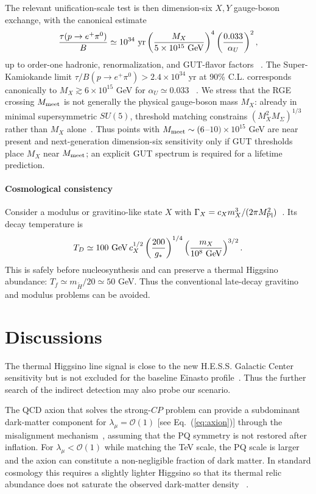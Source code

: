 \documentclass[superscriptaddress,aps,preprintnumbers,amsmath,amssymb,prd,nofootinbib,reprint]{revtex4-1}
\newcommand{\Eq}[1]{Eq.~(\ref{eq:#1})}
\def\O{\mathcal{O}}
\def\l{\lambda}
\newcommand{\mpl}{M_{\rm Pl}}
\def\WY#1{#1}
\begin{document}
The relevant unification-scale test is then dimension-six $X,Y$ gauge-boson
exchange, with the canonical estimate
\begin{equation}
 \frac{\tau(p\to e^+\pi^0)}{B}
 \simeq 10^{34}\ {\rm yr}
 \left(\frac{M_X}{5\times 10^{15}\ {\rm GeV}}\right)^4
 \left(\frac{0.033}{\alpha_U}\right)^2 ,
 \label{eq:proton-d6}
\end{equation}
up to order-one hadronic, renormalization, and GUT-flavor factors
~\cite{Hisano:2022proton,Ellis:2020proton}.  The Super-Kamiokande limit
$\tau/B(p\to e^+\pi^0)>2.4\times10^{34}$ yr at 90\% C.L. corresponds
canonically to $M_X\gtrsim6\times10^{15}$ GeV for $\alpha_U\simeq0.033$
~\cite{Super-Kamiokande:2020wjk}.  We stress that the RGE crossing
$M_{\rm meet}$ is not generally the physical gauge-boson mass $M_X$:
already in minimal supersymmetric $SU(5)$, threshold matching constrains
$(M_X^2M_\Sigma)^{1/3}$ rather than $M_X$ alone~\cite{Hisano:2013gut}.
Thus points with $M_{\rm meet}\sim(6$--$10)\times10^{15}$ GeV are near
present and next-generation dimension-six sensitivity only if GUT
thresholds place $M_X$ near $M_{\rm meet}$; an explicit GUT spectrum is
required for a lifetime prediction.
\endgroup

\paragraph{Cosmological consistency}
Consider a modulus or gravitino-like state $X$ with
$\Gamma_X=c_Xm_X^3/(2\pi\mpl^2)$~\cite{Nakamura:2006uc,Asaka:2006bv}.  Its decay temperature is
\begin{equation}
 T_D\simeq100\ {\rm GeV}\,c_X^{1/2}
 \left(\frac{200}{g_*}\right)^{1/4}
 \left(\frac{m_X}{10^8\ {\rm GeV}}\right)^{3/2}.
\end{equation}
This is safely before nucleosynthesis and can  preserve a
thermal Higgsino abundance: $T_f\simeq m_{\widetilde H}/20\simeq50$ GeV.
Thus the conventional late-decay gravitino and modulus problems can be
avoided.


\section{Discussions}
The thermal Higgsino line signal is close to the new H.E.S.S. \WY{Galactic Center}
sensitivity but is not excluded for the baseline Einasto profile~\cite{Beneke:2019gtg,HESS:2026ila}.
Thus the further search of the indirect detection may also  probe our scenario. 


\WY{The QCD axion that solves the strong-$CP$ problem can provide a
subdominant dark-matter component for $\l_\mu=\O(1)$ [see \Eq{axion}] through
the misalignment mechanism~\cite{Preskill:1982cy,Abbott:1982af,Dine:1982ah}}, \WY{assuming that the PQ
symmetry is not restored after inflation. For $\l_\mu<\O(1)$ while matching the TeV scale, the PQ scale is
larger and the axion can constitute a non-negligible fraction of dark matter.
In standard cosmology this requires a slightly lighter Higgsino so that its
thermal relic abundance does not saturate the observed dark-matter density
~\cite{Nagata:2014wma}.}
\end{document}
